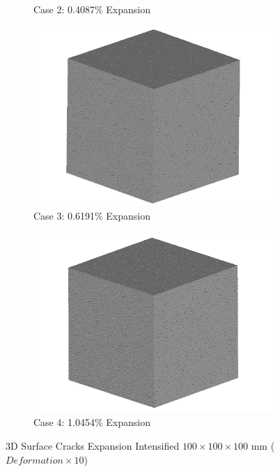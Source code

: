 \begin{figure}[ht!]
\begin{subfigure}{.5\textwidth}
    \caption{Case 2: 0.4087\% Expansion}
    \end{subfigure}%
    \begin{subfigure}{.5\textwidth}
      \centering
      \includegraphics[width=.8\linewidth]{Files/exp_3D/DEF/A30X-1C_3_3d.png}
    \caption{Case 3: 0.6191\% Expansion}
    \end{subfigure}
    \begin{subfigure}{.5\textwidth}
      \centering
      \includegraphics[width=.8\linewidth]{Files/exp_3D/DEF/A30X-1C_4_3d.png}
    \caption{Case 4: 1.0454\% Expansion}
    \end{subfigure}%

  \caption{3D Surface Cracks Expansion Intensified $100 \times 100 \times 100$ mm ($Deformation \times 10$)}
  \label{fig:DEF_A30X-1C_3Dss}
\end{figure}

